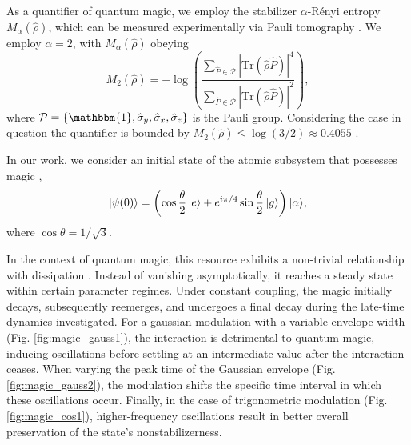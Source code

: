 \documentclass[aps,pre,superscriptaddress,twocolumn,10pt]{revtex4-2}
\begin{document}
As a quantifier of quantum magic, we employ the stabilizer $\alpha$-Rényi entropy  \cite{Leone2022,Brokemeier2025,Mittal2026} $M_\alpha(\hat{\rho})$, which can be measured experimentally via Pauli tomography \cite{Oliviero2022}.
We employ $\alpha=2$,  with $M_\alpha(\hat{\rho})$ obeying
\begin{equation}
M_2(\hat{\rho}) =-\log \left( \frac{\sum_{\hat{P} \in \mathcal{P}} |\mathrm{Tr}(\hat{\rho} \hat{P})|^{4}}{\sum_{\hat{P} \in \mathcal{P}} |\mathrm{Tr}(\hat{\rho} \hat{P}) |^2} \right),
\end{equation}
where $\mathcal{P}=\{\mathbbm{1},\hat{\sigma}_y,\hat{\sigma}_x,\hat{\sigma}_z \}$ is the Pauli group.
Considering the case in question the quantifier is bounded by $M_2(\hat{\rho})\leq \log(3/2)\approx0.4055$ \cite{Wang2023}.

In our work, we consider an initial state of the atomic subsystem that possesses magic \cite{Bravyi2005,Haug2026}, 
\begin{equation}
    \label{eq:max_magic}
    \ket{\psi(0)} = \left(\cos\frac{\theta}{2}\ket{e}+e^{i\pi/4}\sin\frac{\theta}{2}\ket{g}\right)|\alpha \rangle,
\end{equation}
where $\cos\theta = 1/\sqrt{3}$.

In the context of quantum magic, this resource exhibits a non-trivial relationship with dissipation \cite{Oliviero2022,Mittal2026}. 
Instead of vanishing asymptotically, it reaches a steady state within certain parameter regimes. 
Under constant coupling, the magic initially decays, subsequently reemerges, and undergoes a final decay during the late-time dynamics investigated.
For a gaussian modulation with a variable envelope width (Fig. \ref{fig:magic_gauss1}), the interaction is detrimental to quantum magic, inducing oscillations before settling at an intermediate value after the interaction ceases. When varying the peak time of the Gaussian envelope (Fig. \ref{fig:magic_gauss2}), the modulation shifts the specific time interval in which these oscillations occur. Finally, in the case of trigonometric modulation (Fig. \ref{fig:magic_cos1}), higher-frequency oscillations result in better overall preservation of the state's nonstabilizerness.
\end{document}
